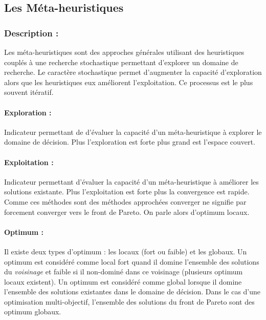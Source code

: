 \subsection{Les Méta-heuristiques} %
\label{sub:les_meta_heuristiques}
\subsubsection{Description :} %
\label{ssub:description}
Les méta-heuristiques sont des approches générales utilisant des heuristiques
couplés à une recherche stochastique permettant d’explorer un domaine de recherche.
Le caractère stochastique permet d’augmenter la capacité d’exploration alors que
les heuristiques eux améliorent l’exploitation. Ce processus est le plus souvent
itératif.

\paragraph{Exploration :} %
\label{par:exploration}
Indicateur permettant de d’évaluer la capacité d’un méta-heuristique à explorer
le domaine de décision. Plus l’exploration est forte plus grand est l’espace
couvert.

\paragraph{Exploitation :} %
\label{par:exploitation}
Indicateur permettant d’évaluer la capacité d’un méta-heuristique à améliorer les
solutions existante. Plus l’exploitation est forte plus la convergence est rapide.
Comme ces méthodes sont des méthodes approchées converger ne signifie par forcement
converger vers le front de Pareto. On parle alors d’optimum locaux.

\paragraph{Optimum :} %
\label{par:optimum}
Il existe deux types d’optimum : les locaux (fort ou faible) et les globaux.
Un optimum est considéré comme local fort quand il domine l’ensemble des solutions
du \emph{voisinage} et faible si il non-dominé dans ce voisinage (plusieurs
optimum locaux existent). Un optimum est considéré comme global lorsque il domine
l’ensemble des solutions existantes dans le domaine de décision. Dans le cas d’une
optimisation multi-objectif, l’ensemble des solutions du front de Pareto sont des
optimum globaux.

